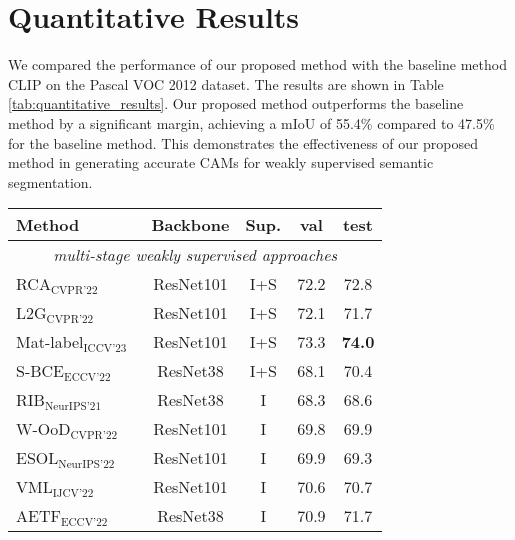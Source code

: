
\section{Quantitative Results}
\label{subsec: Quantitative Results}
We compared the performance of our proposed method with the baseline method CLIP \cite{wsss_frozen_clip} on the Pascal VOC 2012 dataset. The results are shown in Table \ref{tab:quantitative_results}. Our proposed method outperforms the baseline method by a significant margin, achieving a mIoU of 55.4\% compared to 47.5\% for the baseline method. This demonstrates the effectiveness of our proposed method in generating accurate CAMs for weakly supervised semantic segmentation.

\begin{table}[ht]
    \centering
    \renewcommand{\arraystretch}{1.2}
    \setlength{\tabcolsep}{6pt}
    \begin{tabular}{l c c c c}
        \hline
        Method                                                               & Backbone   & Sup. & val           & test          \\
        \hline
        \multicolumn{5}{c}{\textit{multi-stage weakly supervised approaches}}                                                    \\
        RCA$_{\text{CVPR'22}}$~\cite{wsss_RCA}             & ResNet101  & I+S  & 72.2          & 72.8          \\
        L2G$_{\text{CVPR'22}}$~\cite{wsss_L2G}             & ResNet101  & I+S  & 72.1          & 71.7          \\
        Mat-label$_{\text{ICCV'23}}$~\cite{wsss_MatLabel}  & ResNet101  & I+S  & 73.3          & \textbf{74.0} \\
        S-BCE$_{\text{ECCV'22}}$~\cite{wsss_s_bce}         & ResNet38   & I+S  & 68.1          & 70.4          \\
        RIB$_{\text{NeurIPS'21}}$~\cite{wsss_rib}          & ResNet38   & I    & 68.3          & 68.6          \\
        W-OoD$_{\text{CVPR'22}}$~\cite{wsss_ood}      & ResNet101  & I    & 69.8          & 69.9          \\
        ESOL$_{\text{NeurIPS'22}}$~\cite{wsss_esol}   & ResNet101  & I    & 69.9          & 69.3          \\
        VML$_{\text{IJCV'22}}$~\cite{wsss_vml}        & ResNet101  & I    & 70.6          & 70.7          \\
        AETF$_{\text{ECCV'22}}$~\cite{wsss_aetf}      & ResNet38   & I    & 70.9          & 71.7          \\

\end{tabular}
\end{table}
